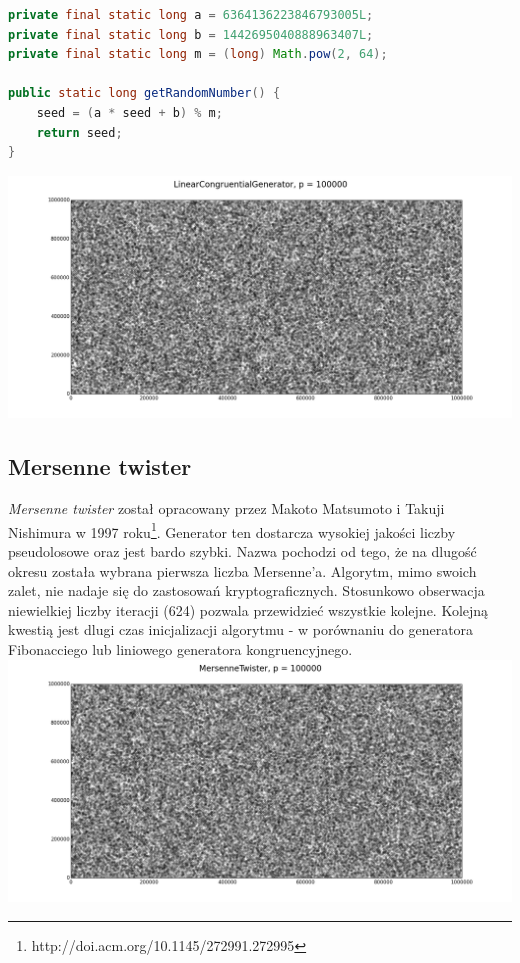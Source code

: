 \documentclass[a4paper, 11pt]{article} %
\begin{document}
\begin{lstlisting}[style=mystyle, language=java, frame=single, caption = Generowanie następnej liczby pseudolosowej przez LCG]
private final static long a = 6364136223846793005L;
private final static long b = 1442695040888963407L;
private final static long m = (long) Math.pow(2, 64);

public static long getRandomNumber() {
    seed = (a * seed + b) % m;
    return seed;
}
\end{lstlisting}
\includegraphics[width=\linewidth]{img/lcg-2.png}
\subsection{Mersenne twister}

\textit{Mersenne twister} został opracowany przez Makoto Matsumoto i Takuji Nishimura w 1997 roku\footnote{http://doi.acm.org/10.1145/272991.272995}. Generator ten dostarcza wysokiej jakości liczby pseudolosowe oraz jest bardo szybki. Nazwa pochodzi od tego, że na dlugość okresu została wybrana pierwsza liczba Mersenne'a. Algorytm, mimo swoich zalet, nie nadaje się do zastosowań kryptograficznych. Stosunkowo obserwacja niewielkiej liczby iteracji (624) pozwala przewidzieć wszystkie kolejne. Kolejną kwestią jest dlugi czas inicjalizacji algorytmu - w porównaniu do generatora Fibonacciego lub liniowego generatora kongruencyjnego. 
\includegraphics[width=\linewidth]{img/mt-1.png}
\end{document}
